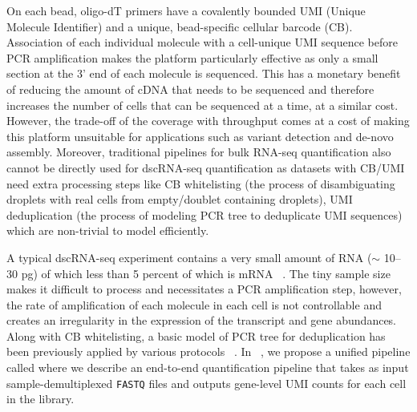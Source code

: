 On each bead, oligo-dT primers have a covalently bounded UMI (Unique Molecule Identifier) and a unique, bead-specific cellular barcode (CB). Association of each individual molecule with a cell-unique UMI sequence before PCR amplification makes the platform particularly effective as only a small section at the 3' end of each molecule is sequenced. This has a monetary benefit of reducing the amount of cDNA that needs to be sequenced and therefore increases the number of cells that can be sequenced at a time, at a similar cost. However, the trade-off of the coverage with throughput comes at a cost of making this platform unsuitable for applications such as variant detection and de-novo assembly. Moreover, traditional pipelines for bulk RNA-seq quantification also cannot be directly used for dscRNA-seq quantification as datasets with CB/UMI need extra processing steps like CB whitelisting (the process of disambiguating droplets with real cells from empty/doublet containing droplets), UMI deduplication (the process of modeling PCR tree to deduplicate UMI sequences) which are non-trivial to model efficiently.

A typical dscRNA-seq experiment contains a very small amount of RNA ($\sim$ 10--30 pg) of which less than 5 percent of which is mRNA ~\citep{lukesthesis}. The tiny sample size makes it difficult to process and necessitates a PCR amplification step, however, the rate of amplification of each molecule in each cell is not controllable and creates an irregularity in the expression of the transcript and gene abundances. Along with CB whitelisting, a basic model of PCR tree for deduplication has been previously applied by various protocols ~\citep{dropseq, tenx}. In ~, we propose a unified pipeline called \alevin where we describe an end-to-end quantification pipeline that takes as input sample-demultiplexed \texttt{FASTQ} files and outputs gene-level UMI counts for each cell in the library.